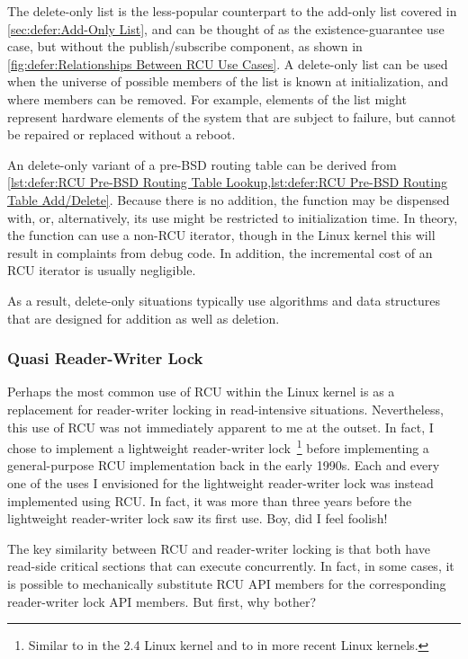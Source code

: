 The delete-only list is the less-popular counterpart to the add-only list
covered in \cref{sec:defer:Add-Only List}, and can be thought of as the
existence-guarantee use case, but without the publish/subscribe component,
as shown in \cref{fig:defer:Relationships Between RCU Use Cases}.
A delete-only list can be used when the universe of possible members of
the list is known at initialization, and where members can be removed.
For example, elements of the list might represent hardware elements of
the system that are subject to failure, but cannot be repaired or
replaced without a reboot.

An delete-only variant of a pre-BSD routing table can be derived from
\cref{lst:defer:RCU Pre-BSD Routing Table Lookup,lst:defer:RCU Pre-BSD Routing Table Add/Delete}.
Because there is no addition, the  function may be
dispensed with, or, alternatively, its use might be restricted to
initialization time.
In theory, the  function can use a non-RCU iterator,
though in the Linux kernel this will result in complaints from debug code.
In addition, the incremental cost of an RCU iterator is usually
negligible.

As a result, delete-only situations typically use algorithms and data
structures that are designed for addition as well as deletion.

\subsubsection{Quasi Reader-Writer Lock}
\label{sec:defer:Quasi Reader-Writer Lock}

Perhaps the most common use of RCU within the Linux kernel is as
a replacement for reader-writer locking in read-intensive situations.
Nevertheless, this use of RCU was not immediately apparent to me
at the outset.
In fact, I chose to implement a lightweight reader-writer
lock~\cite{WilsonCHsieh92a}\footnote{
	Similar to  in the 2.4 Linux kernel and to
	 in more recent Linux kernels.}
before implementing a general-purpose RCU implementation
back in the early 1990s.
Each and every one of the uses I envisioned for the lightweight reader-writer
lock was instead implemented using RCU\@.
In fact, it was more than
three years before the lightweight reader-writer lock saw its first use.
Boy, did I feel foolish!

The key similarity between RCU and reader-writer locking is that
both have read-side critical sections that can execute concurrently.
In fact, in some cases, it is possible to mechanically substitute RCU API
members for the corresponding reader-writer lock API members.
But first, why bother?

